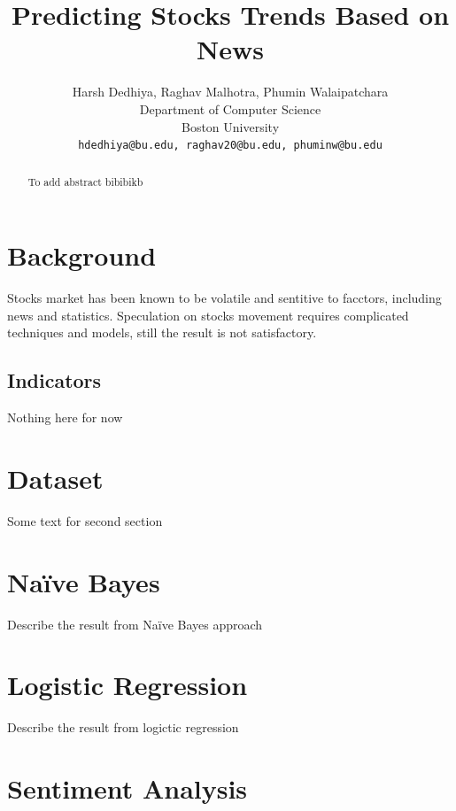 \documentclass{article}
\title{Predicting Stocks Trends Based on News}
\author{
Harsh Dedhiya, Raghav Malhotra, Phumin Walaipatchara\\
Department of Computer Science\\
Boston University\\
\texttt{hdedhiya@bu.edu, raghav20@bu.edu, phuminw@bu.edu}\\
}
\begin{document}
\maketitle
\begin{abstract}
    To add abstract bibibikb
\end{abstract}
\section{Background}
Stocks market has been known to be volatile and sentitive to facctors, including news and statistics.
 Speculation on stocks movement requires complicated techniques and models, still the result is not
 satisfactory.
\subsection{Indicators}
Nothing here for now 

\section{Dataset}
Some text for second section

\section{Na\"ive Bayes}
Describe the result from Na\"ive Bayes approach

\section{Logistic Regression}
Describe the result from logictic regression

\section{Sentiment Analysis}
\end{document}
